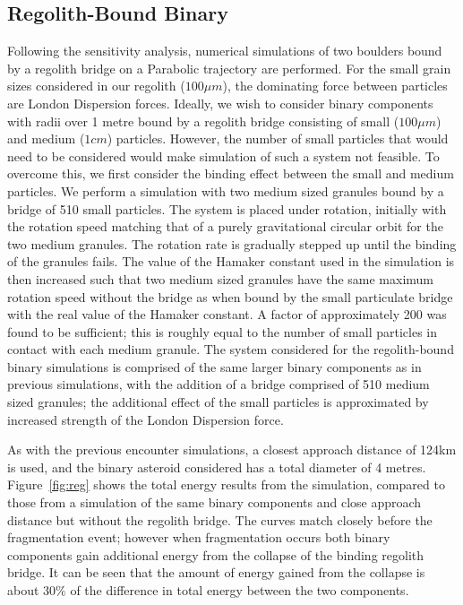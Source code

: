 \documentclass[letterpaper, preprint, paper,11pt]{AAS}	%
\begin{document}
\subsection{Regolith-Bound Binary}
Following the sensitivity analysis, numerical simulations of two boulders bound by a regolith bridge on a Parabolic trajectory are performed. For the small grain sizes considered in our regolith ($100\mu m$), the dominating force between particles are London Dispersion forces. Ideally, we wish to consider binary components with radii over 1 metre bound by a regolith bridge consisting of small ($100\mu m$) and medium ($1cm$) particles. However, the number of small particles that would need to be considered would make simulation of such a system not feasible. To overcome this, we first consider the binding effect between the small and medium particles. We perform a simulation with two medium sized granules bound by a bridge of 510 small particles. The system is placed under rotation, initially with the rotation speed matching that of a purely gravitational circular orbit for the two medium granules. The rotation rate is gradually stepped up until the binding of the granules fails. The value of the Hamaker\cite{hamaker} constant used in the simulation is then increased such that two medium sized granules have the same maximum rotation speed without the bridge as when bound by the small particulate bridge with the real value of the Hamaker\cite{hamaker} constant. A factor of approximately 200 was found to be sufficient; this is roughly equal to the number of small particles in contact with each medium granule. The system considered for the regolith-bound binary simulations is comprised of the same larger binary components as in previous simulations, with the addition of a bridge comprised of 510 medium sized granules; the additional effect of the small particles is approximated by increased strength of the London Dispersion force.  
  
As with the previous encounter simulations, a closest approach distance of 124km is used, and the binary asteroid considered has a total diameter of 4 metres. Figure~\ref{fig:reg} shows the total energy results from the simulation, compared to those from a simulation of the same binary components and close approach distance but without the regolith bridge. The curves match closely before the fragmentation event; however when fragmentation occurs both binary components gain additional energy from the collapse of the binding regolith bridge. It can be seen that the amount of energy gained from the collapse is about $30\%$ of the difference in total energy between the two components.
 
\end{document}
